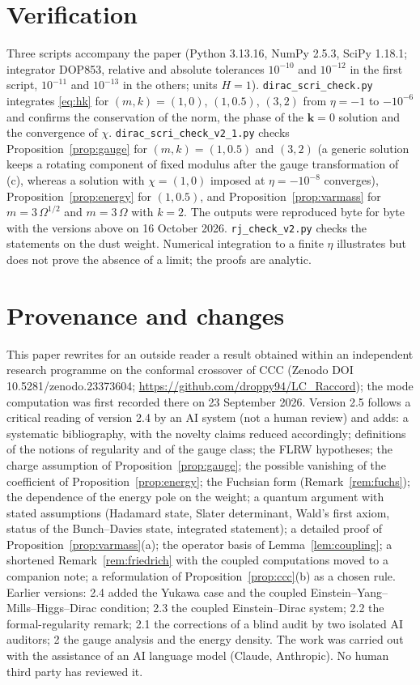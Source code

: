\documentclass[11pt,a4paper]{article}
\theoremstyle{definition}
\begin{document}
\section*{Verification}
Three scripts accompany the paper (Python 3.13.16, NumPy 2.5.3, SciPy 1.18.1; integrator DOP853, relative and absolute tolerances $10^{-10}$ and $10^{-12}$ in the first script, $10^{-11}$ and $10^{-13}$ in the others; units $H=1$). \texttt{dirac\_scri\_check.py} integrates \eqref{eq:hk} for $(m,k)=(1,0)$, $(1,0.5)$, $(3,2)$ from $\eta=-1$ to $-10^{-6}$ and confirms the conservation of the norm, the phase of the $\mathbf{k}=0$ solution and the convergence of $\chi$. \texttt{dirac\_scri\_check\_v2\_1.py} checks Proposition~\ref{prop:gauge} for $(m,k)=(1,0.5)$ and $(3,2)$ (a generic solution keeps a rotating component of fixed modulus after the gauge transformation of (c), whereas a solution with $\chi=(1,0)$ imposed at $\eta=-10^{-8}$ converges), Proposition~\ref{prop:energy} for $(1,0.5)$, and Proposition~\ref{prop:varmass} for $m=3\,\Omega^{1/2}$ and $m=3\,\Omega$ with $k=2$. The outputs were reproduced byte for byte with the versions above on 16 October 2026. \texttt{rj\_check\_v2.py} \cite{Companion} checks the statements on the dust weight. Numerical integration to a finite $\eta$ illustrates but does not prove the absence of a limit; the proofs are analytic.

\section*{Provenance and changes}
This paper rewrites for an outside reader a result obtained within an independent research programme on the conformal crossover of CCC (Zenodo DOI 10.5281/zenodo.23373604; \url{https://github.com/droppy94/LC_Raccord}); the mode computation was first recorded there on 23 September 2026. Version 2.5 follows a critical reading of version 2.4 by an AI system (not a human review) and adds: a systematic bibliography, with the novelty claims reduced accordingly; definitions of the notions of regularity and of the gauge class; the FLRW hypotheses; the charge assumption of Proposition~\ref{prop:gauge}; the possible vanishing of the coefficient of Proposition~\ref{prop:energy}; the Fuchsian form (Remark~\ref{rem:fuchs}); the dependence of the energy pole on the weight; a quantum argument with stated assumptions (Hadamard state, Slater determinant, Wald's first axiom, status of the Bunch--Davies state, integrated statement); a detailed proof of Proposition~\ref{prop:varmass}(a); the operator basis of Lemma~\ref{lem:coupling}; a shortened Remark~\ref{rem:friedrich} with the coupled computations moved to a companion note; a reformulation of Proposition~\ref{prop:ccc}(b) as a chosen rule. Earlier versions: 2.4 added the Yukawa case and the coupled Einstein--Yang--Mills--Higgs--Dirac condition; 2.3 the coupled Einstein--Dirac system; 2.2 the formal-regularity remark; 2.1 the corrections of a blind audit by two isolated AI auditors; 2 the gauge analysis and the energy density. The work was carried out with the assistance of an AI language model (Claude, Anthropic). No human third party has reviewed it.
\end{document}

